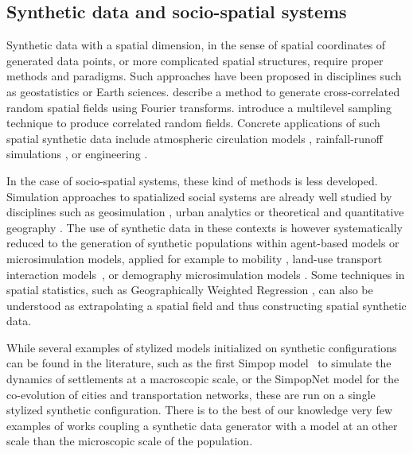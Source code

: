 \documentclass{article}
\begin{document}
\subsection*{Synthetic data and socio-spatial systems}

Synthetic data with a spatial dimension, in the sense of spatial coordinates of generated data points, or more complicated spatial structures, require proper methods and paradigms. Such approaches have been proposed in disciplines such as geostatistics or Earth sciences. \cite{robin1993cross} describe a method to generate cross-correlated random spatial fields using Fourier transforms. \cite{osborn2017multilevel} introduce a multilevel sampling technique to produce correlated random fields. Concrete applications of such spatial synthetic data include atmospheric circulation models \cite{gourdji2010regional}, rainfall-runoff simulations \cite{robin1993cross}, or engineering \cite{zhao2018simulation}.


In the case of socio-spatial systems, these kind of methods is less developed. Simulation approaches to spatialized social systems are already well studied by disciplines such as geosimulation \cite{benenson2004geosimulation}, urban analytics \cite{batty2013new} or theoretical and quantitative geography \cite{pumain2018evolutionary}. The use of synthetic data in these contexts is however systematically reduced to the generation of synthetic populations within agent-based models or microsimulation models, applied for example to mobility \cite{banos2005simulating}, land-use transport interaction models~\cite{pritchard2009advances}, or demography microsimulation models \cite{birkin1988synthesis}. Some techniques in spatial statistics, such as Geographically Weighted Regression \cite{brunsdon1998geographically}, can also be understood as extrapolating a spatial field and thus constructing spatial synthetic data.


While several examples of stylized models initialized on synthetic configurations can be found in the literature, such as the first Simpop model~\cite{sanders1997simpop} to simulate the dynamics of settlements at a macroscopic scale, or the SimpopNet model \cite{schmitt2014modelisation} for the co-evolution of cities and transportation networks, these are run on a single stylized synthetic configuration. There is to the best of our knowledge very few examples of works coupling a synthetic data generator with a model at an other scale than the microscopic scale of the population. 
\end{document}
